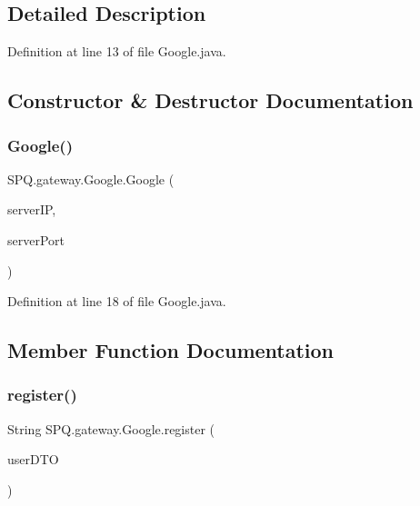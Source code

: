\subsection{Detailed Description}


Definition at line 13 of file Google.\+java.



\subsection{Constructor \& Destructor Documentation}
\mbox{\label{class_s_p_q_1_1gateway_1_1_google_a8b232ea9ca746c4500b6c02e86b76fef}} 
\subsubsection{\texorpdfstring{Google()}{Google()}}
{\footnotesize\ttfamily S\+P\+Q.\+gateway.\+Google.\+Google (\begin{DoxyParamCaption}\item[{String}]{server\+IP,  }\item[{String}]{server\+Port }\end{DoxyParamCaption})}



Definition at line 18 of file Google.\+java.



\subsection{Member Function Documentation}
\mbox{\label{class_s_p_q_1_1gateway_1_1_google_ab287ce4fd789224c45be6037a99a937b}} 
\subsubsection{\texorpdfstring{register()}{register()}}
{\footnotesize\ttfamily String S\+P\+Q.\+gateway.\+Google.\+register (\begin{DoxyParamCaption}\item[{\mbox{\hyperlink{class_s_p_q_1_1dto_1_1_user_d_t_o}{User\+D\+TO}}}]{user\+D\+TO }\end{DoxyParamCaption})}



